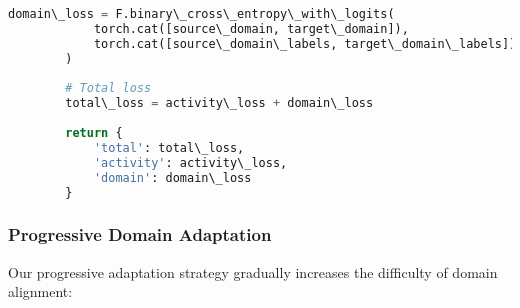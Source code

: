 \documentclass[journal]{IEEEtran}
\begin{document}
\begin{lstlisting}[language=Python, caption=Domain-Adversarial Training Framework]
        domain\_loss = F.binary\_cross\_entropy\_with\_logits(
            torch.cat([source\_domain, target\_domain]),
            torch.cat([source\_domain\_labels, target\_domain\_labels])
        )
        
        # Total loss
        total\_loss = activity\_loss + domain\_loss
        
        return {
            'total': total\_loss,
            'activity': activity\_loss,
            'domain': domain\_loss
        }
\end{lstlisting}

\subsubsection{Progressive Domain Adaptation}

Our progressive adaptation strategy gradually increases the difficulty of domain alignment:
\end{document}
